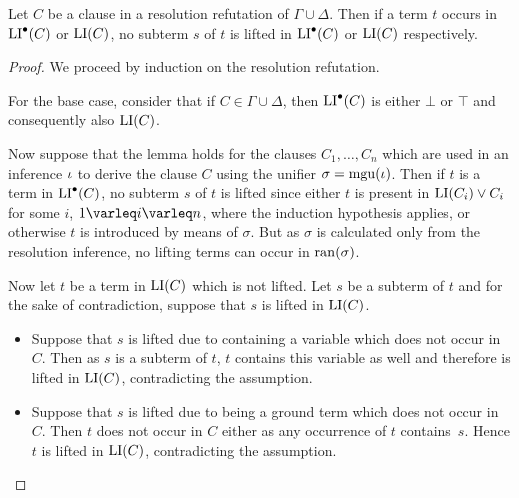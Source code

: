 \begin{lemma}
	\label{lemma:lifting_conditions}
	Let $C$ be a clause in a resolution refutation of $\Gamma \cup \Delta$.
	Then if a term $t$ occurs in $\operatorname{LI}^\bullet(C)$ or $\operatorname{LI}(C)$, no subterm $s$ of $t$ is lifted in $\operatorname{LI}^\bullet(C)$ or $\operatorname{LI}(C)$ respectively.
\end{lemma}
\begin{proof}
	We proceed by induction on the resolution refutation.

	For the base case, consider that if $C \in \Gamma \cup \Delta$, then $\operatorname{LI}^\bullet(C)$ is either $\bot$ or $\top$ and consequently also $\operatorname{LI}(C)$.

	Now suppose that the lemma holds for the clauses $C_1, \dots, C_n$ which are used in an inference $\iota$ to derive the clause $C$ using the unifier $\sigma = \operatorname{mgu}(\iota)$.
	Then if $t$ is a term in $\operatorname{LI}^\bullet(C)$, no subterm $s$ of $t$ is lifted since either $t$ is present in $\operatorname{LI}(C_i) \lor C_i$ for some $i$, $1\varleq i \varleq n$, where the induction hypothesis applies,
	or otherwise $t$ is introduced by means of $\sigma$. But as $\sigma$ is calculated only from the resolution inference, no lifting terms can occur in $\operatorname{ran}(\sigma)$.

	Now let $t$ be a term in $\operatorname{LI}(C)$ which is not lifted. Let $s$ be a subterm of $t$ and for the sake of contradiction, suppose that $s$ is lifted in $\operatorname{LI}(C)$.
	\begin{itemize}
		\item Suppose that $s$ is lifted due to containing a variable which does not occur in\nolinebreak{} $C$.
			Then as $s$ is a subterm of $t$, $t$ contains this variable as well and therefore is lifted in $\operatorname{LI}(C)$, contradicting the assumption.

		\item Suppose that $s$ is lifted due to being a ground term which does not occur in\nolinebreak{} $C$.
			Then $t$ does not occur in $C$ either as any occurrence of $t$ contains~$s$. 
			Hence $t$ is lifted in $\operatorname{LI}(C)$, contradicting the assumption.
			\qedhere
	\end{itemize}
\end{proof}

